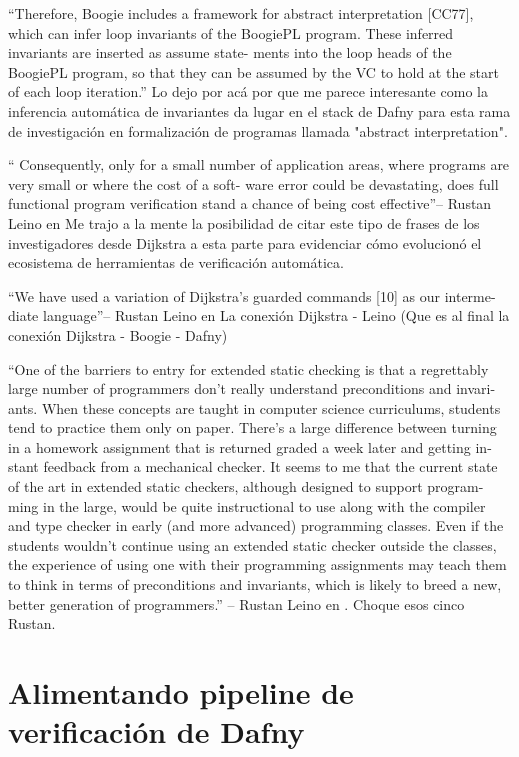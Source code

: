 \documentclass[12pt, a4paper, openany, fleqn]{book}
\begin{document}
    ``Therefore, Boogie includes a
    framework for abstract interpretation [CC77], which can infer loop invariants of
    the BoogiePL program. These inferred invariants are inserted as assume state-
    ments into the loop heads of the BoogiePL program, so that they can be assumed
    by the VC to hold at the start of each loop iteration.''\cite{10.1007/11804192_17}
    Lo dejo por acá por que me parece interesante como la inferencia automática de invariantes da lugar en el stack de Dafny para esta rama de investigación en formalización de programas llamada "abstract interpretation". 

    `` Consequently, only for a small number of
    application areas, where programs are very small or where the cost of a soft-
    ware error could be devastating, does full functional program verification stand
    a chance of being cost effective''-- Rustan Leino en \cite{Leino2001} Me trajo a la mente la posibilidad de citar este tipo de frases de los investigadores desde Dijkstra a esta parte para evidenciar cómo evolucionó el ecosistema de herramientas de verificación automática.

    ``We have used a variation of Dijkstra’s guarded commands [10] as our interme-
    diate language''-- Rustan Leino en \cite{Leino2001} La conexión Dijkstra - Leino (Que es al final la conexión Dijkstra - Boogie - Dafny)


    ``One of the barriers to entry for extended static checking is that a regrettably
    large number of programmers don’t really understand preconditions and invari-
    ants. When these concepts are taught in computer science curriculums, students
    tend to practice them only on paper. There’s a large difference between turning
    in a homework assignment that is returned graded a week later and getting in-
    stant feedback from a mechanical checker. It seems to me that the current state
    of the art in extended static checkers, although designed to support program-
    ming in the large, would be quite instructional to use along with the compiler
    and type checker in early (and more advanced) programming classes. Even if the
    students wouldn’t continue using an extended static checker outside the classes,
    the experience of using one with their programming assignments may teach them
    to think in terms of preconditions and invariants, which is likely to breed a new,
    better generation of programmers.'' -- Rustan Leino en \cite{Leino2001}. Choque esos cinco Rustan.

    \section{Alimentando pipeline de verificación de Dafny}
\end{document}
